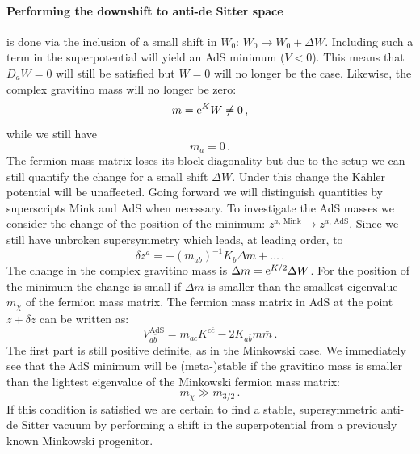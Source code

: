 \documentclass[a4paper,12pt,twoside,openright]{report}
\newcommand{\be}{\begin{equation}}
\newcommand{\ee}{\end{equation}}
\def\rme{{\rm e}}
\begin{document}
\paragraph{Performing the downshift to anti-de Sitter space} is done via the inclusion of a small shift in $W_0$: $W_0 \to W_0 +\Delta W$. Including such a term in the superpotential will yield an AdS minimum ($V<0$). This means that $D_aW=0$ will still be satisfied but $W=0$ will no longer be the case. Likewise, the complex gravitino mass will no longer be zero:
\be 
m = \rme^K W \neq 0\,,
\ee 
while we still have 
\be 
m_a = 0\,.
\ee
The fermion mass matrix loses its block diagonality but due to the setup we can still quantify the change for a small shift $\Delta W$. Under this change the Kähler potential will be unaffected. Going forward we will distinguish quantities by superscripts Mink and AdS when necessary. To investigate the AdS masses we consider the change of the position of the minimum: $z^{a,\,\text{Mink}} \to z^{a,\,\text{AdS}}$. Since we still have unbroken supersymmetry which leads, at leading order, to
\be 
\delta z^a = - (m_{ab})^{-1} K_b \Delta m + \ldots\,.
\ee
The change in the complex gravitino mass is $\Delta m = \rme^{K/2} \Delta W$. For the position of the minimum the change is small if $\Delta m$ is smaller than the smallest eigenvalue $m_\chi$ of the fermion mass matrix. The fermion mass matrix in AdS at the point $z + \delta z$ can be written as:
\be 
V_{a\bar{b}}^{\text{AdS}}=m_{ac}K^{c\bar{c}}-2K_{a\bar{b}} m \bar{m}\,.
\ee
The first part is still positive definite, as in the Minkowski case. We immediately see that the AdS minimum will be (meta-)stable if the gravitino mass is smaller than the lightest eigenvalue of the Minkowski fermion mass matrix:
\be 
m_{\chi} \gg m_{3/2}\,.
\ee
If this condition is satisfied we are certain to find a stable, supersymmetric anti-de Sitter vacuum by performing a shift in the superpotential from a previously known Minkowski progenitor.
\end{document}
